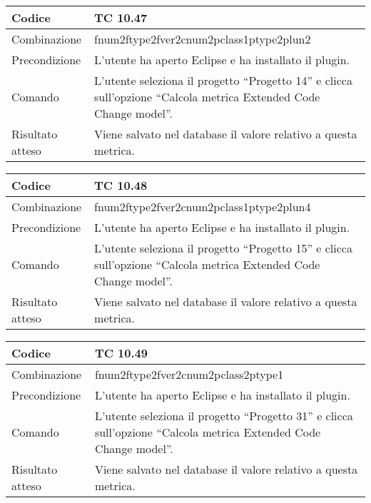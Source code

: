 \begin{table}[ht]
\begin{tabular}{|p{3cm}|p{9cm}|}
\hline
\cellcolor{lightgray}Codice				& TC 10.47								\\
\hline
\cellcolor{lightgray}Combinazione		& fnum2ftype2fver2cnum2pclass1ptype2plun2									\\
\hline
\cellcolor{lightgray}Precondizione		& L'utente ha aperto Eclipse e ha installato il plugin.		\\
\hline
\cellcolor{lightgray}Comando			& L'utente seleziona il progetto ``Progetto 14''  e clicca sull'opzione ``Calcola metrica Extended Code Change model''.	\\
\hline
\cellcolor{lightgray}Risultato atteso	& Viene salvato nel database il valore relativo a questa metrica.\\
\hline
\end{tabular}
\end{table}

\begin{table}[ht]
\begin{tabular}{|p{3cm}|p{9cm}|}
\hline
\cellcolor{lightgray}Codice				& TC 10.48								\\
\hline
\cellcolor{lightgray}Combinazione		& fnum2ftype2fver2cnum2pclass1ptype2plun4									\\
\hline
\cellcolor{lightgray}Precondizione		& L'utente ha aperto Eclipse e ha installato il plugin.		\\
\hline
\cellcolor{lightgray}Comando			& L'utente seleziona il progetto ``Progetto 15''  e clicca sull'opzione ``Calcola metrica Extended Code Change model''.	\\
\hline
\cellcolor{lightgray}Risultato atteso	& Viene salvato nel database il valore relativo a questa metrica.\\
\hline
\end{tabular}
\end{table}

\begin{table}[ht]
\begin{tabular}{|p{3cm}|p{9cm}|}
\hline
\cellcolor{lightgray}Codice				& TC 10.49								\\
\hline
\cellcolor{lightgray}Combinazione		& fnum2ftype2fver2cnum2pclass2ptype1									\\
\hline
\cellcolor{lightgray}Precondizione		& L'utente ha aperto Eclipse e ha installato il plugin.		\\
\hline
\cellcolor{lightgray}Comando			& L'utente seleziona il progetto ``Progetto 31''  e clicca sull'opzione ``Calcola metrica Extended Code Change model''.	\\
\hline
\cellcolor{lightgray}Risultato atteso	& Viene salvato nel database il valore relativo a questa metrica.\\
\hline
\end{tabular}
\end{table}

